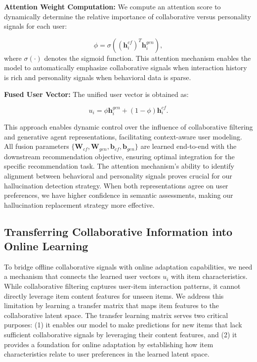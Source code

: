 \documentclass[acmsmall]{acmart}
\begin{document}
\textbf{Attention Weight Computation:} We compute an attention score to dynamically determine the relative importance of collaborative versus personality signals for each user:

\begin{equation}
\phi = \sigma\left((\mathbf{h}^{cf}_i)^T \mathbf{h}^{gen}_i\right),
\label{eq:attention_weight}
\end{equation}
where $\sigma(\cdot)$ denotes the sigmoid function. This attention mechanism enables the model to automatically emphasize collaborative signals when interaction history is rich and personality signals when behavioral data is sparse.

\textbf{Fused User Vector:} The unified user vector is obtained as:

\begin{equation}
u_i = \phi \mathbf{h}^{gen}_i + (1 - \phi) \mathbf{h}^{cf}_i.
\label{eq:final_fusion}
\end{equation}

This approach enables dynamic control over the influence of collaborative filtering and generative agent representations, facilitating context-aware user modeling. All fusion parameters $\{\mathbf{W}_{cf}, \mathbf{W}_{gen}, \mathbf{b}_{cf}, \mathbf{b}_{gen}\}$ are learned end-to-end with the downstream recommendation objective, ensuring optimal integration for the specific recommendation task.
The attention mechanism's ability to identify alignment between behavioral and personality signals proves crucial for our hallucination detection strategy. When both representations agree on user preferences, we have higher confidence in semantic assessments, making our hallucination replacement strategy more effective.
\subsection{Transferring Collaborative Information into Online Learning}
\label{sec:transfer_learning}


To bridge offline collaborative signals with online adaptation capabilities, we need a mechanism that connects the learned user vectors $u_i$ with item characteristics. While collaborative filtering captures user-item interaction patterns, it cannot directly leverage item content features for unseen items. We address this limitation by learning a transfer matrix that maps item features to the collaborative latent space.
 The transfer learning matrix serves two critical purposes: (1) it enables our model to make predictions for new items that lack sufficient collaborative signals by leveraging their content features, and (2) it provides a foundation for online adaptation by establishing how item characteristics relate to user preferences in the learned latent space.
\end{document}

